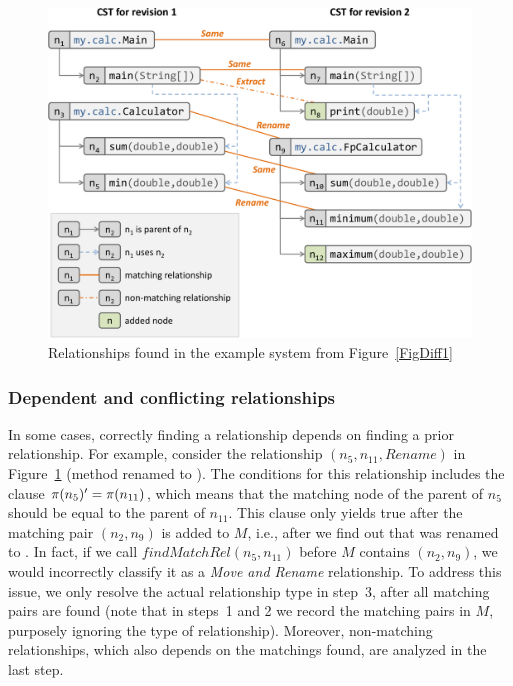 \begin{figure}[htb]
\centering
\includegraphics[width=1.0\linewidth]{img/relationshipDiff1.pdf}
\caption{Relationships found in the example system from Figure~\ref{FigDiff1}}
\label{FigRelationships1}
\end{figure}


\subsubsection{Dependent and conflicting relationships}
\label{SecDependentConflictingRel}

In some cases, correctly finding a relationship depends on finding a prior relationship.
For example, consider the relationship $(n_5, n_{11}, Rename)$ in Figure~\ref{FigRelationships1} (method  renamed to ).
The conditions for this relationship includes the clause $\operatorname{\pi}(n_5)' = \operatorname{\pi}(n_{11})$, which means that the matching node of the parent of $n_5$ should be equal to the parent of $n_{11}$.
This clause only yields true after the matching pair $(n_2, n_9)$ is added to $M$, i.e., after we find out that  was renamed to .
In fact, if we call $\mathit{findMatchRel}(n_5, n_{11})$ before $M$ contains $(n_2, n_9)$, we would incorrectly classify it as a \textit{Move and Rename} relationship.
To address this issue, we only resolve the actual relationship type in step~3, after all matching pairs are found (note that in steps~1 and 2 we record the matching pairs in $M$, purposely ignoring the type of relationship).
Moreover, non-matching relationships, which also depends on the matchings found, are analyzed in the last step. 

